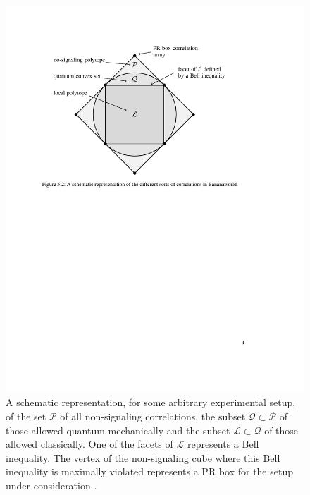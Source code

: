 \begin{figure}[ht]
\centering
    \includegraphics[width=4.5in]{LQP.pdf}
 \caption{A schematic representation, for some arbitrary experimental setup, of the set $\mathcal{P}$ of all non-signaling correlations, the subset $\mathcal{Q} \subset \mathcal{P}$ of those allowed quantum-mechanically and the subset $\mathcal{L} \subset \mathcal{Q}$ of those allowed classically. One of the facets of $\mathcal{L}$ represents a Bell inequality. The vertex of the non-signaling cube where this Bell inequality is maximally violated represents a PR box for the setup under consideration \citep[p.\ 107, Figure 5.2]{Bub 2016}.}
   \label{LQP}
\end{figure}


